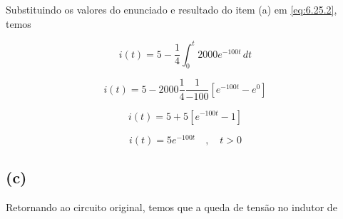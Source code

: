 Substituindo os valores do enunciado e resultado do item (a) em \eqref{eq:6.25.2}, temos

\[ i(t) = 5 - \frac{1}{4}\int_{0}^{t} 2000e^{-100t} \,dt  \]

\[ i(t) = 5 - 2000\frac{1}{4}\frac{1}{-100}\left[e^{-100t} - e^{0}\right]  \]

\[ i(t) = 5 + 5\left[e^{-100t} - 1\right]  \]

\[ \boxed{i(t) = 5e^{-100t} \quad ,  \quad t > 0}  \]

\subsection*{(c)}

Retornando ao circuito original, temos que a queda de tensão no indutor de 


